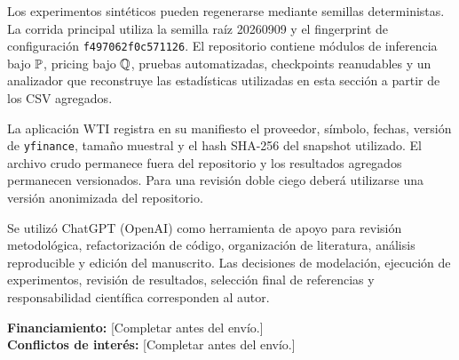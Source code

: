 Los experimentos sintéticos pueden regenerarse mediante semillas deterministas. La corrida principal utiliza la semilla raíz 20260909 y el fingerprint de configuración \texttt{f497062f0c571126}. El repositorio contiene módulos de inferencia bajo $\mathbb{P}$, pricing bajo $\mathbb{Q}$, pruebas automatizadas, checkpoints reanudables y un analizador que reconstruye las estadísticas utilizadas en esta sección a partir de los CSV agregados.

La aplicación WTI registra en su manifiesto el proveedor, símbolo, fechas, versión de \texttt{yfinance}, tamaño muestral y el hash SHA-256 del snapshot utilizado. El archivo crudo permanece fuera del repositorio y los resultados agregados permanecen versionados. Para una revisión doble ciego deberá utilizarse una versión anonimizada del repositorio.

Se utilizó ChatGPT (OpenAI) como herramienta de apoyo para revisión metodológica, refactorización de código, organización de literatura, análisis reproducible y edición del manuscrito. Las decisiones de modelación, ejecución de experimentos, revisión de resultados, selección final de referencias y responsabilidad científica corresponden al autor.

\textbf{Financiamiento:} [Completar antes del envío.]\\
\textbf{Conflictos de interés:} [Completar antes del envío.]
